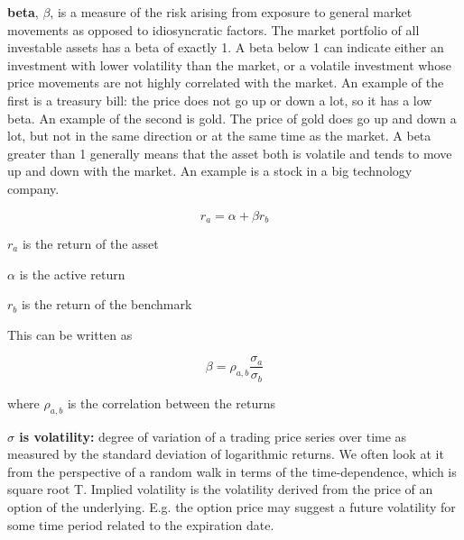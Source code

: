 \documentclass[10pt,landscape]{article}
\begin{document}
\begin{multicols}{3}
 \vspace{0.15cm}

\textbf{beta}, $\beta$, is a measure of the risk arising from exposure to general market movements as opposed to idiosyncratic factors. The market portfolio of all investable assets has a beta of exactly 1. A beta below 1 can indicate either an investment with lower volatility than the market, or a volatile investment whose price movements are not highly correlated with the market. An example of the first is a treasury bill: the price does not go up or down a lot, so it has a low beta. An example of the second is gold. The price of gold does go up and down a lot, but not in the same direction or at the same time as the market. A beta greater than 1 generally means that the asset both is volatile and tends to move up and down with the market. An example is a stock in a big technology company.

 \vspace{0.15cm}
 
 $$r_a = \alpha + \beta r_b$$
 
  \vspace{0.15cm}

$r_a$ is the return of the asset

 \vspace{0.15cm}
 
 $\alpha$ is the active return
 
  \vspace{0.15cm}
 
 $r_b$ is the return of the benchmark

\vspace{0.15cm}

This can be written as


$$\beta = \rho_{a,b} \frac{\sigma_a}{\sigma_b}$$

where $\rho_{a,b}$ is the correlation between the returns 

 \vspace{0.15cm}
 
\textbf{$\sigma$ is volatility:}  degree of variation of a trading price series over time as measured by the standard deviation of logarithmic returns. We often look at it from the perspective of a random walk in terms of the time-dependence, which is square root T. Implied volatility is the volatility derived from the price of an option of the underlying. E.g. the option price may suggest a future volatility for some time period related to the expiration date.

\vspace{0.15cm}


\end{multicols}
\end{document}
